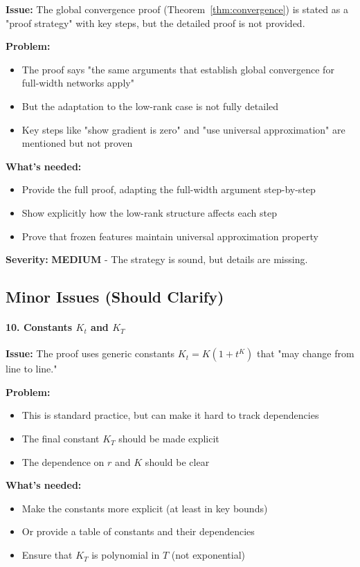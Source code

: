 \textbf{Issue:} The global convergence proof (Theorem~\ref{thm:convergence}) is stated as a "proof strategy" with key steps, but the detailed proof is not provided.

\textbf{Problem:}
\begin{itemize}
\item The proof says "the same arguments that establish global convergence for full-width networks apply"
\item But the adaptation to the low-rank case is not fully detailed
\item Key steps like "show gradient is zero" and "use universal approximation" are mentioned but not proven
\end{itemize}

\textbf{What's needed:}
\begin{itemize}
\item Provide the full proof, adapting the full-width argument step-by-step
\item Show explicitly how the low-rank structure affects each step
\item Prove that frozen features maintain universal approximation property
\end{itemize}

\textbf{Severity:} \textbf{MEDIUM} - The strategy is sound, but details are missing.

\subsection{Minor Issues (Should Clarify)}

\paragraph*{10. Constants $K_t$ and $K_T$}

\textbf{Issue:} The proof uses generic constants $K_t = K(1+t^K)$ that "may change from line to line."

\textbf{Problem:}
\begin{itemize}
\item This is standard practice, but can make it hard to track dependencies
\item The final constant $K_T$ should be made explicit
\item The dependence on $r$ and $K$ should be clear
\end{itemize}

\textbf{What's needed:}
\begin{itemize}
\item Make the constants more explicit (at least in key bounds)
\item Or provide a table of constants and their dependencies
\item Ensure that $K_T$ is polynomial in $T$ (not exponential)
\end{itemize}


